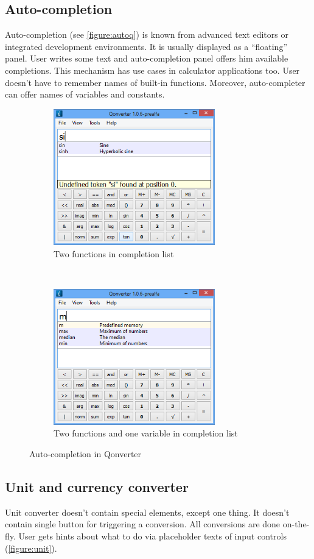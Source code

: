 \subsection{Auto-completion}
Auto-completion (see \autoref{figure:autoq}) is known from advanced text editors or integrated development environments. It is usually displayed as a \enquote{floating} panel. User writes some text and auto-completion panel offers him available completions. This mechanism has use cases in calculator applications too. User doesn't have to remember names of built-in functions. Moreover, auto-completer can offer names of variables and constants.

\begin{figure}[ht]
\centering
\begin{subfigure}[t]{0.48\textwidth}
\centering
\includegraphics[width=7cm]{graphics/real-world/08-complete1.png}
\caption{Two functions in completion list}
\end{subfigure}
~
\begin{subfigure}[t]{0.48\textwidth}
\centering
\includegraphics[width=7cm]{graphics/real-world/08-complete2.png}
\caption{Two functions and one variable in completion list}
\end{subfigure}
\caption{Auto-completion in Qonverter}\label{figure:autoq}
\end{figure}

\subsection{Unit and currency converter}
Unit converter doesn't contain special elements, except one thing. It doesn't contain single button for triggering a conversion. All conversions are done on-the-fly. User gets hints about what to do via placeholder texts of input controls (\autoref{figure:unit}).

